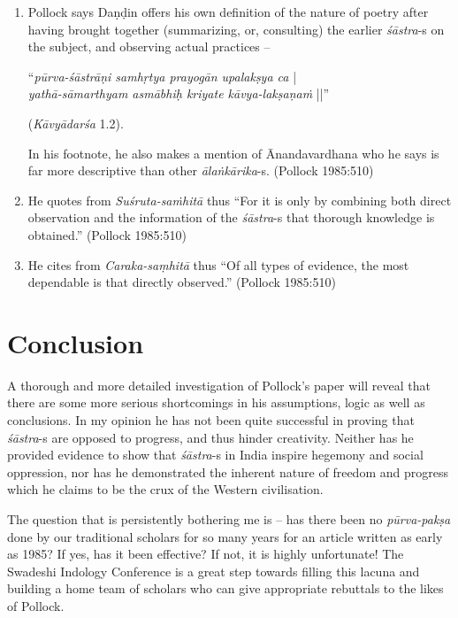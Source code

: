 \begin{enumerate}
\item Pollock says Daṇḍin offers his own definition of the nature of poetry after having brought together (summarizing, or, consulting) the earlier {\it śāstra}-s on the subject, and observing actual practices -- 

``\textsl{pūrva-śāstrāṇi samhṛtya prayogān upalakṣya ca} |\\
\textsl{yathā-sāmarthyam asmābhiḥ kriyate kāvya-lakṣaṇaṁ} ||'' 

\hfill (\textsl{Kāvyādarśa} 1.2).

In his footnote, he also makes a mention of Ānandavardhana who he says is far more descriptive than other {\it ālaṅkārika}-s. (Pollock 1985:510)

\item He quotes from \textsl{Suśruta-saṁhitā} thus ``For it is only by combining both direct observation and the information of the {\it śāstra}-s that thorough knowledge is obtained.'' (Pollock 1985:510)

\item He cites from \textsl{Caraka-saṃhitā} thus ``Of all types of evidence, the most dependable is that directly observed.'' (Pollock 1985:510)
\end{enumerate}

\newpage

\section*{Conclusion}

A thorough and more detailed investigation of Pollock's paper will reveal that there are some more serious shortcomings in his assumptions, logic as well as conclusions. In my opinion he has not been quite successful in proving that {\it śāstra}-s are opposed to progress, and thus hinder creativity. Neither has he provided evidence to show that {\it śāstra}-s in India inspire hegemony and social oppression, nor has he demonstrated the inherent nature of freedom and progress which he claims to be the crux of the Western civilisation.

The question that is persistently bothering me is -- has there been no {\it pūrva-pakṣa} done by our traditional scholars for so many years for an article written as early as 1985? If yes, has it been effective? If not, it is highly unfortunate! The Swadeshi Indology Conference is a great step towards filling this lacuna and building a home team of scholars who can give appropriate rebuttals to the likes of Pollock.

